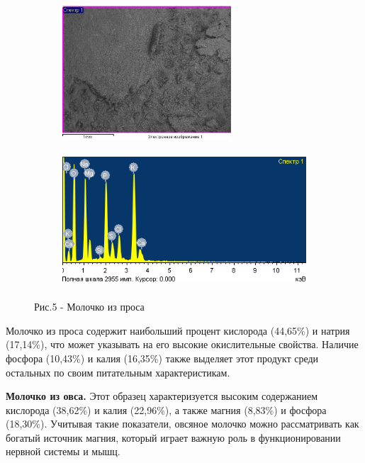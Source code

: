 \begin{figure}[H]
	\centering
	\begin{subfigure}{0.4\textwidth}
		\centering
		\includegraphics[height=5cm]{media/pish/image52}
	\end{subfigure}
	\hfill
	\begin{subfigure}{0.55\textwidth}
		\centering
		\includegraphics[height=5cm]{media/pish/image53}
	\end{subfigure}
	\caption*{Рис.5 - Молочко из проса}
\end{figure}

\begin{multicols}{2}
Молочко из проса содержит наибольший процент кислорода (44,65\%) и
натрия (17,14\%), что может указывать на его высокие окислительные
свойства. Наличие фосфора (10,43\%) и калия (16,35\%) также выделяет
этот продукт среди остальных по своим питательным характеристикам.

{\bfseries Молочко из овса.} Этот образец характеризуется высоким
содержанием кислорода (38,62\%) и калия (22,96\%), а также магния
(8,83\%) и фосфора (18,30\%). Учитывая такие показатели, овсяное молочко
можно рассматривать как богатый источник магния, который играет важную
роль в функционировании нервной системы и мышц.
\end{multicols}

